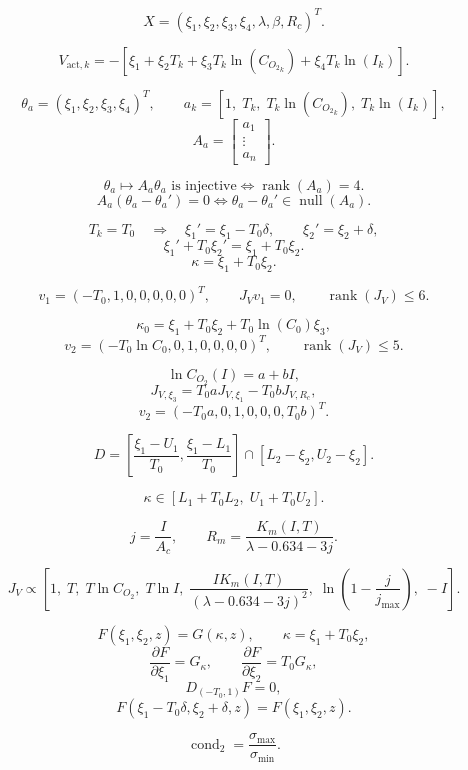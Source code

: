 
\newcommand{\COtwo}{C_{O_2}}
\newcommand{\POtwo}{P_{O_2}}
\newcommand{\Jv}{J_V}
\newcommand{\Aa}{A_a}
\newcommand{\Ac}{A_c}

\[
X=(\xi_1,\xi_2,\xi_3,\xi_4,\lambda,\beta,R_c)^T.
\]

\[
V_{\mathrm{act},k}
=
-\left[
\xi_1+\xi_2T_k+\xi_3T_k\ln(\COtwo_k)+\xi_4T_k\ln(I_k)
\right].
\]

\[
\theta_a=(\xi_1,\xi_2,\xi_3,\xi_4)^T,
\qquad
a_k=
\left[
1,\;T_k,\;T_k\ln(\COtwo_k),\;T_k\ln(I_k)
\right],
\]
\[
\Aa=
\begin{bmatrix}
a_1\\
\vdots\\
a_n
\end{bmatrix}.
\]

\[
\theta_a\mapsto \Aa\theta_a
\text{ is injective}
\iff
\operatorname{rank}(\Aa)=4.
\]
\[
\Aa(\theta_a-\theta_a')=0
\iff
\theta_a-\theta_a'\in\operatorname{null}(\Aa).
\]

\[
T_k=T_0
\quad\Longrightarrow\quad
\xi_1'=\xi_1-T_0\delta,
\qquad
\xi_2'=\xi_2+\delta,
\]
\[
\xi_1'+T_0\xi_2'
=
\xi_1+T_0\xi_2.
\]
\[
\kappa=\xi_1+T_0\xi_2.
\]

\[
v_1=(-T_0,1,0,0,0,0,0)^T,
\qquad
\Jv v_1=0,
\qquad
\operatorname{rank}(\Jv)\le 6.
\]

\[
\kappa_0=
\xi_1+T_0\xi_2+T_0\ln(C_0)\xi_3,
\]
\[
v_2=
(-T_0\ln C_0,0,1,0,0,0,0)^T,
\qquad
\operatorname{rank}(\Jv)\le 5.
\]

\[
\ln \COtwo(I)=a+bI,
\]
\[
J_{V,\xi_3}
=
T_0aJ_{V,\xi_1}
-
T_0bJ_{V,R_c},
\]
\[
v_2=(-T_0a,0,1,0,0,0,T_0b)^T.
\]

\[
D=
\left[
\frac{\xi_1-U_1}{T_0},
\frac{\xi_1-L_1}{T_0}
\right]
\cap
[L_2-\xi_2,U_2-\xi_2].
\]

\[
\kappa\in
[L_1+T_0L_2,\;U_1+T_0U_2].
\]

\[
j=\frac{I}{\Ac},
\qquad
R_m=
\frac{K_m(I,T)}
{\lambda-0.634-3j}.
\]

\[
\Jv
\propto
\left[
1,\;
T,\;
T\ln\COtwo,\;
T\ln I,\;
\frac{I K_m(I,T)}{(\lambda-0.634-3j)^2},\;
\ln\left(1-\frac{j}{j_{\max}}\right),\;
-I
\right].
\]

\[
F(\xi_1,\xi_2,z)=G(\kappa,z),
\qquad
\kappa=\xi_1+T_0\xi_2,
\]
\[
\frac{\partial F}{\partial\xi_1}=G_{\kappa},
\qquad
\frac{\partial F}{\partial\xi_2}=T_0G_{\kappa},
\]
\[
D_{(-T_0,1)}F=0,
\]
\[
F(\xi_1-T_0\delta,\xi_2+\delta,z)
=
F(\xi_1,\xi_2,z).
\]

\[
\operatorname{cond}_2
=
\frac{\sigma_{\max}}{\sigma_{\min}}.
\]
